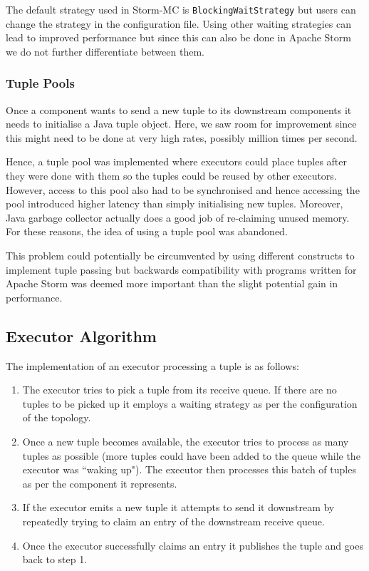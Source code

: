 The default strategy used in Storm-MC is \texttt{BlockingWaitStrategy} but users can change the strategy in the configuration file. Using other waiting strategies can lead to improved performance but since this can also be done in Apache Storm we do not further differentiate between them.

\subsubsection{Tuple Pools}

Once a component wants to send a new tuple to its downstream components it needs to initialise a Java tuple object. Here, we saw room for improvement since this might need to be done at very high rates, possibly million times per second.

Hence, a tuple pool was implemented where executors could place tuples after they were done with them so the tuples could be reused by other executors. However, access to this pool also had to be synchronised and hence accessing the pool introduced higher latency than simply initialising new tuples. Moreover, Java garbage collector actually does a good job of re-claiming unused memory. For these reasons, the idea of using a tuple pool was abandoned.

This problem could potentially be circumvented by using different constructs to implement tuple passing but backwards compatibility with programs written for Apache Storm was deemed more important than the slight potential gain in performance.

\subsection{Executor Algorithm}

The implementation of an executor processing a tuple is as follows:

\begin{enumerate}
	\item The executor tries to pick a tuple from its receive queue. If there are no tuples to be picked up it employs a waiting strategy as per the configuration of the topology.
	\item Once a new tuple becomes available, the executor tries to process as many tuples as possible (more tuples could have been added to the queue while the executor was ``waking up"). The executor then processes this batch of tuples as per the component it represents.
	\item If the executor emits a new tuple it attempts to send it downstream by repeatedly trying to claim an entry of the downstream receive queue.
	\item Once the executor successfully claims an entry it publishes the tuple and goes back to step 1.
\end{enumerate}

